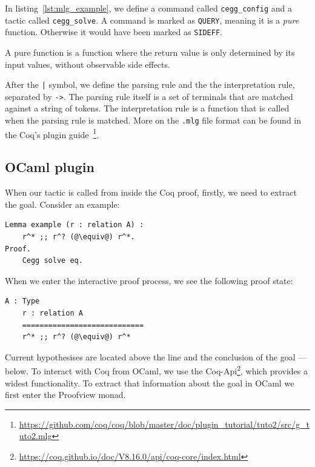 In listing~\ref{lst:mlg_example}, we define a command called \texttt{cegg\_config} and a tactic called \texttt{cegg\_solve}. A command is marked as \texttt{QUERY}, meaning it is a \textit{pure} function. Otherwise it would have been marked as \texttt{SIDEFF}. 
\begin{definition}
    A pure function is a function where the return value is only determined by its input values, without observable side effects. 
\end{definition}
After the \texttt{|} symbol, we define the parsing rule and the the interpretation rule, separated by \texttt{->}. The parsing rule itself is a set of terminals that are matched against a string of tokens. The interpretation rule is a function that is called when the parsing rule is matched. More on the \texttt{.mlg} file format can be found in the Coq's plugin guide~\footnote{\href{https://github.com/coq/coq/blob/master/doc/plugin\_tutorial/tuto2/src/g\_tuto2.mlg}{https://github.com/coq/coq/blob/master/doc/plugin\_tutorial/tuto2/src/g\_tuto2.mlg}}.

\subsection{OCaml plugin}
When our tactic is called from inside the Coq proof, firstly, we need to extract the goal. Consider an example: 

\vspace{0.5cm}
\begin{lstlisting}[language=coq]
Lemma example (r : relation A) : 
    r^* ;; r^? (@\equiv@) r^*.
Proof.
    Cegg solve eq. 
\end{lstlisting}

When we enter the interactive proof process, we see the following proof state: 

\vspace{0.5cm}
\begin{lstlisting}[language=coq]
    A : Type 
    r : relation A
    ============================
    r^* ;; r^? (@\equiv@) r^*
\end{lstlisting}

Current hypothesises are located above the line and the conclusion of the goal --- below. To interact with Coq from OCaml, we use the Coq-Api\footnote{\href{https://coq.github.io/doc/V8.16.0/api/coq-core/index.html}{https://coq.github.io/doc/V8.16.0/api/coq-core/index.html}}, which provides a widest functionality. To extract that information about the goal in OCaml we first enter the Proofview monad.

